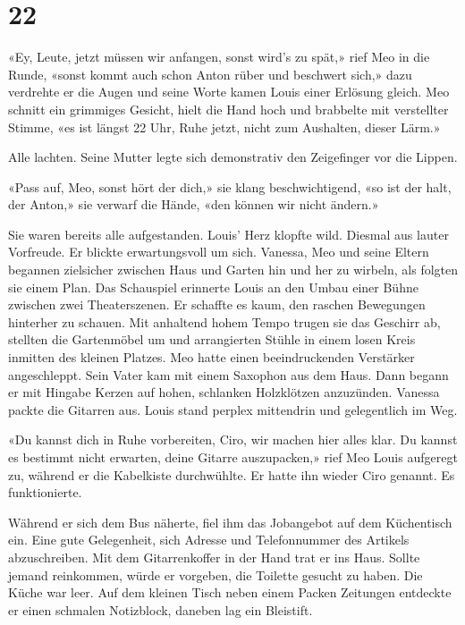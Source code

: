 \chapter{22}



«Ey, Leute, jetzt müssen wir anfangen, sonst wird’s zu spät,» rief Meo
in die Runde, «sonst kommt auch schon Anton rüber und beschwert sich,»
dazu verdrehte er die Augen und seine Worte kamen Louis einer
Erlösung gleich. Meo schnitt ein grimmiges Gesicht, hielt die Hand hoch
und brabbelte mit verstellter Stimme, «es ist längst 22 Uhr, Ruhe jetzt, nicht zum Aushalten, dieser Lärm.»

Alle lachten. Seine Mutter legte sich demonstrativ den Zeigefinger
vor die Lippen.

«Pass auf, Meo, sonst hört der dich,» sie klang beschwichtigend, «so ist der halt, der Anton,» sie verwarf die Hände, «den können wir nicht ändern.»

Sie waren bereits alle aufgestanden. Louis’ Herz klopfte wild. Diesmal
aus lauter Vorfreude. Er blickte erwartungsvoll um sich. Vanessa, Meo und seine
Eltern begannen zielsicher zwischen Haus und Garten hin und her zu
wirbeln, als folgten sie einem Plan. Das Schauspiel erinnerte Louis an
den Umbau einer Bühne zwischen zwei Theaterszenen. Er schaffte es kaum,
den raschen Bewegungen hinterher zu schauen.
Mit anhaltend hohem Tempo trugen sie das Geschirr ab, stellten die Gartenmöbel um und arrangierten Stühle in einem losen Kreis inmitten des kleinen Platzes. Meo hatte einen beeindruckenden Verstärker
angeschleppt. Sein Vater kam mit einem Saxophon aus dem Haus. Dann
begann er mit Hingabe Kerzen auf hohen, schlanken Holzklötzen
anzuzünden. Vanessa packte die Gitarren aus. Louis stand perplex
mittendrin und gelegentlich im Weg. 

«Du kannst dich in Ruhe vorbereiten, Ciro, wir machen hier alles klar.
Du kannst es bestimmt nicht erwarten, deine Gitarre auszupacken,» rief 
Meo Louis aufgeregt zu, während er die Kabelkiste durchwühlte.
Er hatte ihn wieder Ciro genannt. Es funktionierte. 

Während er sich dem Bus näherte, fiel ihm das Jobangebot auf dem Küchentisch ein. Eine gute Gelegenheit, sich Adresse und Telefonnummer des Artikels abzuschreiben. Mit dem Gitarrenkoffer in der Hand trat er ins Haus. Sollte jemand reinkommen, würde er vorgeben, die Toilette gesucht zu haben. Die Küche war leer. Auf dem kleinen Tisch neben einem Packen Zeitungen entdeckte er einen schmalen Notizblock, daneben lag ein Bleistift. 

